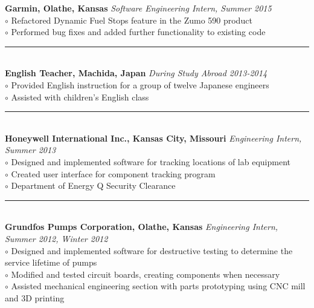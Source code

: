 \documentclass[twoside]{article}
\begin{document}
\begin{adjustwidth}{0.2in}{0in}
\textbf{Garmin, Olathe, Kansas} \hfill \textit{Software Engineering Intern, Summer 2015}\\
$\circ$ Refactored Dynamic Fuel Stops feature in the Zumo 590 product\\
$\circ$ Performed bug fixes and added further functionality to existing code\\
\rule{7.3in}{0.5pt}\\
\textbf{English Teacher, Machida, Japan} \hfill \textit{During Study Abroad 2013-2014}\\
$\circ$ Provided English instruction for a group of twelve Japanese engineers\\
$\circ$ Assisted with children's English class\\
\rule{7.3in}{0.5pt}\\
\textbf{Honeywell International Inc., Kansas City, Missouri} \hfill \textit{Engineering Intern, Summer 2013}\\
$\circ$ Designed and implemented software for tracking locations of lab equipment\\
$\circ$ Created user interface for component tracking program\\
$\circ$ Department of Energy Q Security Clearance\\
\rule{7.3in}{0.5pt}\\
\textbf{Grundfos Pumps Corporation, Olathe, Kansas} \hfill \textit{Engineering Intern, Summer 2012, Winter 2012}\\
$\circ$ Designed and implemented software for destructive testing to determine the service lifetime of pumps\\
$\circ$ Modified and tested circuit boards, creating components when necessary\\
$\circ$ Assisted mechanical engineering section with parts prototyping using CNC mill and 3D printing\\
\end{adjustwidth}
\end{document}
